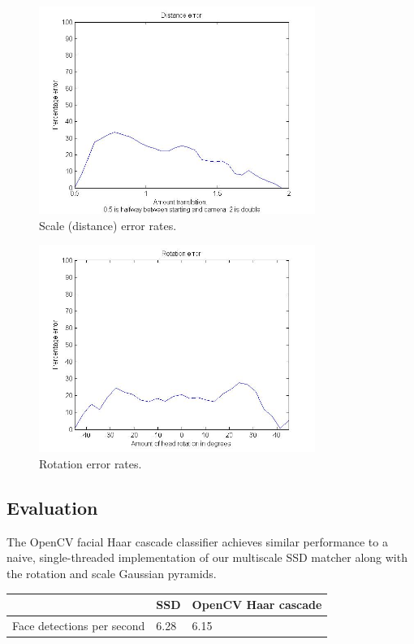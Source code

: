 \documentclass[10pt,twocolumn,letterpaper]{article}
\begin{document}
\begin{figure}[ht!]
\centering
\includegraphics[width=90mm]{distance_error.jpg}
\caption{Scale (distance) error rates.\label{overflow}}
\end{figure}
\begin{figure}[ht!]
\centering
\includegraphics[width=90mm]{rotation_error.jpg}
\caption{Rotation error rates.\label{overflow}}
\end{figure}

\subsection*{Evaluation}
The OpenCV facial Haar cascade classifier achieves similar performance to a naive, single-threaded implementation of our multiscale SSD matcher along with the rotation and scale Gaussian pyramids.
\begin{center}
    \begin{tabular}{| l | l | l |}
    \hline
    \         & \textbf{SSD} & \textbf{OpenCV Haar cascade} \\ \hline
    Face detections per second & 6.28 & 6.15 \\  \hline
    \end{tabular}
\end{center}
\end{document}
